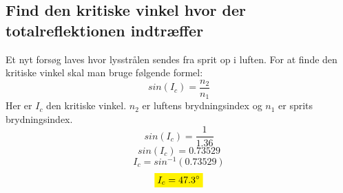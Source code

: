\subsection{Find den kritiske vinkel hvor der totalreflektionen indtræffer}
Et nyt forsøg laves hvor lysstrålen sendes fra sprit op i luften. 
For at finde den kritiske vinkel skal man bruge følgende formel:
\begin{equation*}
    sin(I_c)=\frac{n_2}{n_1}
\end{equation*}
Her er \begin{math}I_c\end{math} den kritiske vinkel. \begin{math}n_2\end{math} er luftens brydningsindex og \begin{math}n_1\end{math} er sprits brydningsindex.
\begin{equation*}
    sin(I_c)=\frac{1}{1.36}
\end{equation*}
\begin{equation*}
    sin(I_c)=0.73529
\end{equation*}
\begin{equation*}
    I_c=sin^{-1}(0.73529)
\end{equation*}
\begin{equation*}
    \mathcolorbox{yellow}{I_c=47.3^{\circ}}
\end{equation*}